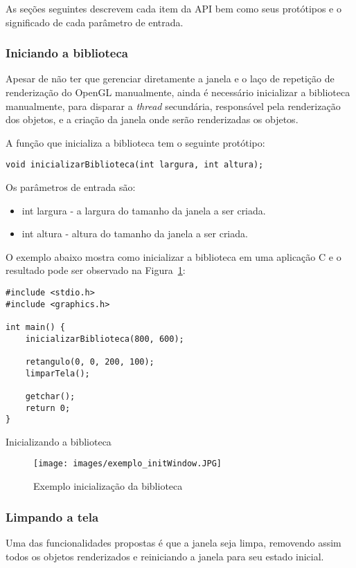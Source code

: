 \documentclass[12pt, %
openright,
oneside, %
a4paper,    %
brazil]{facom-ufu-abntex2}
\begin{document}
As seções seguintes descrevem cada item da API bem como seus protótipos e o significado de cada parâmetro de entrada.

\subsubsection{Iniciando a biblioteca}
Apesar de não ter que gerenciar diretamente a janela e o laço de repetição de renderização do OpenGL manualmente, ainda é necessário inicializar a biblioteca manualmente, para disparar a \textit{thread} secundária, responsável pela renderização dos objetos, e a criação da janela onde serão renderizadas os objetos.

A função que inicializa a biblioteca tem o seguinte protótipo:

\begin{verbatim}
void inicializarBiblioteca(int largura, int altura);
\end{verbatim}

Os parâmetros de entrada são:

\begin{itemize}
    \item int largura - a largura do tamanho da janela a ser criada.
    \item int altura -  altura do tamanho da janela a ser criada.
\end{itemize}

O exemplo abaixo mostra como inicializar a biblioteca em uma aplicação C e o resultado pode ser observado na Figura~\ref{fig:exemplo_initWindow}:
\begin{listing}[ht]
\begin{verbatim}
#include <stdio.h>
#include <graphics.h>

int main() {
    inicializarBiblioteca(800, 600);

    retangulo(0, 0, 200, 100);
    limparTela();

    getchar();
    return 0;
}
\end{verbatim}
\caption{Inicializando a biblioteca}
\label{lst:inicializando_biblioteca}
\end{listing}

\begin{figure}[!htbp]
  \centering
  \texttt{[image: images/exemplo\_initWindow.JPG]}
  \caption{Exemplo inicialização da biblioteca}
  \label{fig:exemplo_initWindow}
\end{figure}

\subsubsection{Limpando a tela}
Uma das funcionalidades propostas é que a janela seja limpa, removendo assim todos os objetos renderizados e reiniciando a janela para seu estado inicial.
\end{document}
